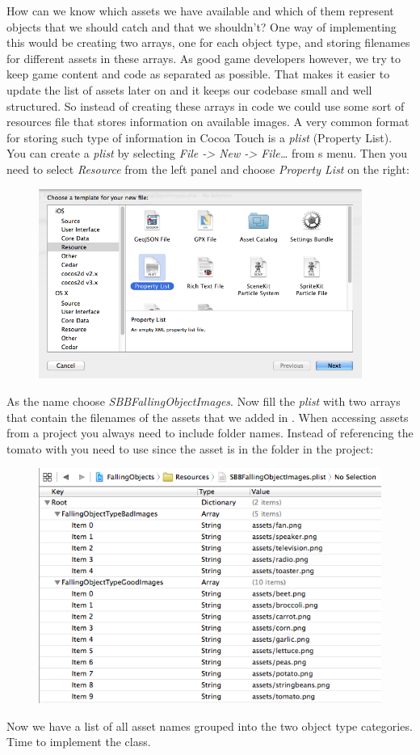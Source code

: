 How can we know which assets we have available and which of them represent
objects that we should catch and that we shouldn't? One way of implementing this
would be creating two arrays, one for each object type, and storing filenames
for different assets in these arrays. As good game developers however, we try to
keep game content and code as separated as possible. That makes it easier to
update the list of assets later on and it keeps our codebase small and well
structured. So instead of creating these arrays in code we could use some sort
of resources file that stores information on available images. A very common format for storing such type of information in Cocoa Touch is a \textit{plist} (Property List). You can create a
\textit{plist} by selecting \textit{File -> New -> File\ldots} from \xcode{}s
menu. Then you need to select \textit{Resource} from the left panel and choose
\textit{Property List} on the right:

\begin{figure}[H]
		\centering
		\includegraphics[width=300pt]{images/Chapter2/create_plist.png}
\end{figure}

As the name choose \textit{SBBFallingObjectImages}. Now fill the \textit{plist}
with two arrays that contain the filenames of the assets that we added in \SB{}.
When accessing assets from a \SB{} project you always need to include folder
names. Instead of referencing the tomato with  you need
to use  since the asset is in the
 folder in the \SB{} project:

\begin{figure}[H]
		\centering
		\includegraphics[width=0.7\linewidth]{images/Chapter2/plist_setup.png}
\end{figure}
Now we have a list of all asset names grouped into the two object type
categories. Time to implement the  class.

